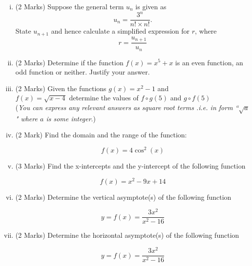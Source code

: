 \documentclass[11pt]{article} %
\begin{document}
\begin{enumerate}[(i)]
		\item (2 Marks) Suppose the general term $u_n$ is given as \[u_n = \displaystyle{\frac{3^n}{n! \times n!} } .\]State $u_{n+1}$ and hence calculate a simplified expression for $r$, where 
		{
			\Large
			\[ r = \frac{u_{n+1}}{u_n}\]
		}
		\vspace{8.8cm}
		
	\item (2 Marks) Determine if the function $f(x) = x^5 + x$ is an even function, an odd function or neither. Justify your answer.
%
	\newpage
	
	\item (2 Marks) Given the functions $g(x) = x^2    - 1$ and \\ $f(x) = \sqrt{x-4}$ determine the values of $f \circ g(5)$ and $g \circ f(5)$
	\\ (\textit{You can express any relevant answers as square root terms .i.e. in form ``$\sqrt{a}$" where $a$ is some integer}.)
	
	\vspace{8.8cm}
	\item (2 Mark) Find the domain and the range of the function:
	
	\[ f(x) = 4 \cos^2(x)  \]
\newpage


	

	
	

	\item (3 Marks) Find the x-intercepts and the y-intercept of the following function

\[ f(x) = x^2 - 9x + 14  \]

	\newpage
	
	\item (2 Marks) Determine the vertical asymptote(s) of the following function
	
	
	\[ y = f(x) = \frac{3x^2}{x^2-16} \]	
	
	\vspace{5.8cm}
	
	\item (2 Marks) Determine the horizontal asymptote(s) of the following function
	
	\[ y = f(x) = \frac{3x^2}{x^2-16} \]
	

\end{enumerate}
\end{document}
